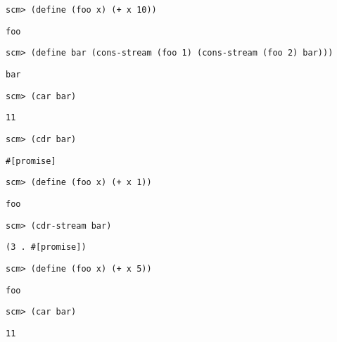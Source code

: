 \documentclass{exam}
\begin{document}
\begin{questions}
\begin{blocksection}
\begin{lstlisting}
scm> (define (foo x) (+ x 10))
\end{lstlisting}
\begin{solution}[.45in]
\texttt{foo}
\end{solution}

\begin{lstlisting}
scm> (define bar (cons-stream (foo 1) (cons-stream (foo 2) bar)))
\end{lstlisting}
\begin{solution}[.45in]
\texttt{bar}
\end{solution}
\end{blocksection}

\begin{blocksection}
\begin{lstlisting}
scm> (car bar)
\end{lstlisting}
\begin{solution}[.45in]
\texttt{11}
\end{solution}

\begin{lstlisting}
scm> (cdr bar)
\end{lstlisting}
\begin{solution}[.45in]
\begin{lstlisting}
#[promise]
\end{lstlisting}
\end{solution}

\begin{lstlisting}
scm> (define (foo x) (+ x 1))
\end{lstlisting}
\begin{solution}[.35in]
\texttt{foo}
\end{solution}

\begin{lstlisting}
scm> (cdr-stream bar)
\end{lstlisting}
\begin{solution}[.35in]
\begin{lstlisting}
(3 . #[promise])
\end{lstlisting}
\end{solution}

\begin{lstlisting}
scm> (define (foo x) (+ x 5))
\end{lstlisting}
\begin{solution}[.35in]
\texttt{foo}
\end{solution}

\begin{lstlisting}
scm> (car bar)
\end{lstlisting}
\begin{solution}[.35in]
\texttt{11}
\end{solution}


\end{blocksection}
\end{questions}
\end{document}
